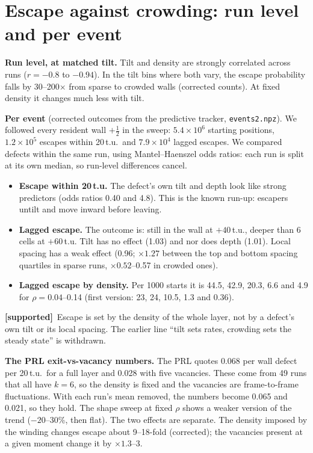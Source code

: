 \documentclass[11pt,a4paper]{article}
\newcommand{\half}{\tfrac12}
\newcommand{\supp}{\textbf{\textcolor{green!50!black}{[supported]}}}
\begin{document}
\section{Escape against crowding: run level and per event}
\textbf{Run level, at matched tilt.} Tilt and density are strongly correlated across runs ($r=-0.8$ to $-0.94$). In the tilt bins where both
vary, the escape probability falls by 30--200$\times$ from sparse to crowded walls (corrected counts). At fixed density it changes much less with tilt.

\textbf{Per event} (corrected outcomes from the predictive tracker, \texttt{events2.npz}). We followed every resident wall $+\half$ in the sweep: $5.4\times10^6$ starting positions, $1.2\times10^5$ escapes within 20\,t.u.\ and $7.9\times10^4$ lagged escapes. We compared defects
within the same run, using Mantel--Haenszel odds ratios: each run is split at its own median, so run-level differences cancel.
\begin{itemize}
\item \textbf{Escape within 20\,t.u.} The defect's own tilt and depth look like strong predictors (odds ratios 0.40 and 4.8). This is the known run-up: escapers untilt and move inward before leaving.
\item \textbf{Lagged escape.} The outcome is: still in the wall at $+40$\,t.u., deeper than 6 cells at $+60$\,t.u. Tilt has no effect (1.03) and nor does depth (1.01). Local spacing has a weak effect (0.96; $\times1.27$ between the top and bottom spacing quartiles in sparse runs, $\times0.52$--0.57 in crowded ones).
\item \textbf{Lagged escape by density.} Per 1000 starts it is 44.5, 42.9, 20.3, 6.6 and 4.9 for $\rho=0.04$--0.14 (first version: 23, 24, 10.5, 1.3 and 0.36).
\end{itemize}
\supp\ Escape is set by the density of the whole layer, not by a defect's own tilt or its local spacing. The earlier line ``tilt sets rates,
crowding sets the steady state'' is withdrawn.

\textbf{The PRL exit-vs-vacancy numbers.} The PRL quotes 0.068 per wall defect per 20\,t.u.\ for a full layer and 0.028 with five vacancies. These come
from 49 runs that all have $k=6$, so the density is fixed and the vacancies are frame-to-frame fluctuations. With each run's mean removed, the
numbers become 0.065 and 0.021, so they hold. The shape sweep at fixed $\rho$ shows a weaker version of the trend ($-20$--30\%, then flat). The two
effects are separate. The density imposed by the winding changes escape about 9--18-fold (corrected); the vacancies present at a given moment change it by $\times1.3$--3.
\end{document}
